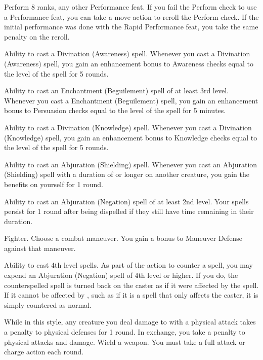 \featpre Perform 8 ranks, any other Performance feat.
\featben If you fail the Perform check to use a Performance feat, you can take a move action to reroll the Perform check.
If the initial performance was done with the Rapid Performance feat, you take the same  penalty on the reroll.

\featpre Ability to cast a Divination (Awareness) spell.
\featben Whenever you cast a Divination (Awareness) spell, you gain an enhancement bonus to Awareness checks equal to the level of the spell for 5 rounds.

\featpre Ability to cast an Enchantment (Beguilement) spell of at least 3rd level.
\featben Whenever you cast a Enchantment (Beguilement) spell, you gain an enhancement bonus to Persuasion checks equal to the level of the spell for 5 minutes.

\featpre Ability to cast a Divination (Knowledge) spell.
\featben Whenever you cast a Divination (Knowledge) spell, you gain an enhancement bonus to Knowledge checks equal to the level of the spell for 5 rounds.

\featpre Ability to cast an Abjuration (Shielding) spell.
\featben Whenever you cast an Abjuration (Shielding) spell with a duration of \durshort or longer on another creature, you gain the benefits on yourself for 1 round.

\featpre Ability to cast an Abjuration (Negation) spell of at least 2nd level.
\featben Your spells persist for 1 round after being dispelled if they still have time remaining in their duration.

\featpre Fighter.
\featben Choose a combat maneuver.
You gain a  bonus to Maneuver Defense against that maneuver.

\featpres
Ability to cast 4th level spells.
\featben As part of the action to counter a spell, you may expend an Abjuration (Negation) spell of 4th level or higher.
If you do, the counterspelled spell is turned back on the caster as if it were affected by the 
spell.
If it cannot be affected by , such as if it is a spell that only affects the caster, it is simply countered as normal.

\featben While in this style, any creature you deal damage to with a physical attack takes a  penalty to physical defenses for 1 round.
In exchange, you take a  penalty to physical attacks and damage.
\stylereq Wield a weapon.
You must take a full attack or charge action each round.

